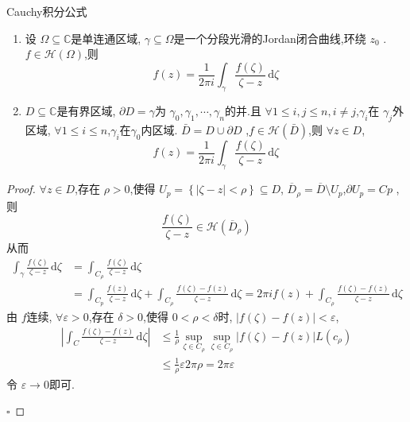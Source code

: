 \documentclass[../../复变函数.tex]{subfiles}
\begin{document}
\begin{theorem}{Cauchy积分公式}
    \begin{enumerate}
        \item 设 \(   \Omega \subseteq \mathbb{C}   \)是单连通区域, \(   \gamma \subseteq  \Omega   \)是一个分段光滑的Jordan闭合曲线,环绕 \(  z_0  \) .\(  f\in \mathcal{H}\left(  \Omega  \right)   \),则\[
            f\left( z \right)= \frac{1 }{2\pi i }\int_{ \gamma }\frac{f\left( \zeta  \right)  }{\zeta -z }\,\mathrm{d} \zeta 
        \]
        \item \(  D\subseteq \mathbb{C}   \)是有界区域, \(   \partial D =  \gamma   \)为 \(   \gamma _0 , \gamma _1 ,\cdots , \gamma _{n}  \)的并.且 \(  \forall 1\le i,j\le n  ,i\neq j\),\(   \gamma _{i}  \)在 \(   \gamma _{j}  \)外区域, \(  \forall 1\le i\le n  \),\(   \gamma _{i}  \)在\(   \gamma _0   \)内区域. \(  \bar{D}= D\cup  \partial D  \)          ,\(  f\in \mathcal{H}\left( \bar{D} \right)   \),则 \(  \forall z \in D  \), \[
        f\left( z \right)= \frac{1 }{2\pi i }\int_{ \gamma }\frac{f\left( \zeta  \right)  }{\zeta -z }\,\mathrm{d} \zeta    
        \]  
    \end{enumerate}
    
\end{theorem}

\begin{proof}
    \(  \forall z \in D  \),存在 \(  \rho > 0  \),使得 \(  U_{p}= \left\{ \left| \zeta -z \right|< \rho   \right\}\subseteq D  \), \(  \overline{D}_{\rho }= \overline{D}\setminus U_{p}  \),\(   \partial U_{p}= Cp  \)     ,则 \[
    \frac{f\left( \zeta  \right)  }{\zeta -z }\in \mathcal{H}\left( \overline{D}_{\rho } \right)  
    \]从而 \[
   \begin{aligned}
    \int_{ \gamma }\frac{f\left( \zeta  \right)  }{\zeta -z }\,\mathrm{d} \zeta & = \int_{C_{\rho }}\frac{f\left( \zeta  \right)  }{\zeta -z }\,\mathrm{d} \zeta \\ 
     & =  \int_{C_{p}}\frac{f\left( z \right)  }{\zeta -z }\,\mathrm{d} \zeta + \int_{C_{\rho }}\frac{f\left( \zeta  \right)-f\left( z \right)   }{\zeta -z }\,\mathrm{d} \zeta = 2\pi if\left( z \right)+ \int_{C_{\rho }}\frac{f\left( \zeta  \right)-f\left( z \right)   }{\zeta -z }\,\mathrm{d} \zeta     
   \end{aligned}  
    \]由 \(  f  \)连续, \(  \forall  \varepsilon > 0  \),存在 \(   \delta  > 0  \),使得 \(  0< \rho <  \delta    \)时, \(  \left| f\left( \zeta  \right)-f\left( z \right)   \right|<  \varepsilon    \), \[
   \begin{aligned}
    \left| \int_{C}\frac{f\left( \zeta  \right)-f\left( z \right)   }{\zeta -z }\,\mathrm{d} \zeta   \right|&\le \frac{1 }{\rho  }\sup _{\zeta \in C_{\rho }}  \sup _{\zeta \in C_{\rho }}\left| f\left( \zeta  \right)-f\left( z \right)   \right|L\left( c_{\rho } \right)\\ 
     &\le \frac{1 }{\rho  } \varepsilon 2  \pi \rho = 2\pi  \varepsilon   
   \end{aligned}  
    \]令 \(   \varepsilon \to 0  \)即可.      

    \hfill $\square$
\end{proof}
\end{document}
